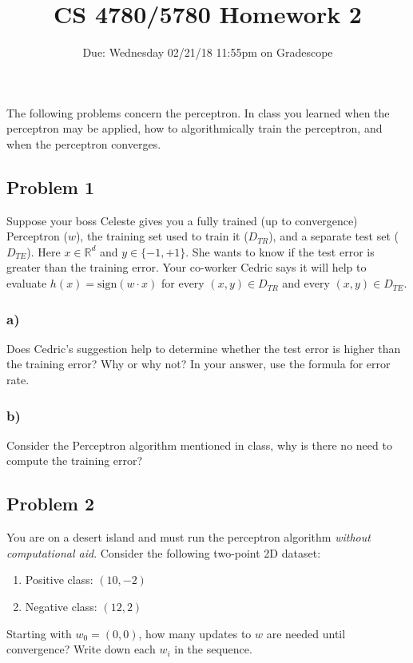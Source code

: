 \documentclass[a4paper]{article}
\title{CS 4780/5780 Homework 2}
\author{Due: Wednesday 02/21/18 11:55pm on Gradescope}
\date{}
\begin{document}
\maketitle

The following problems concern the perceptron. In class you learned when the perceptron may be applied, how to algorithmically train the perceptron, and when the perceptron converges.

\subsection*{Problem 1}
Suppose your boss Celeste gives you a fully trained (up to convergence) Perceptron ($w$), the training set used to train it ($D_{TR}$), and a separate test set ($D_{TE}$). Here $x\in\mathbb{R}^d$ and $y\in\{-1,+1\}$. She wants to know if the test error is greater than the training error. Your co-worker Cedric says it will help to evaluate $h(x)=\text{sign}(w\cdot x)$ for every $(x,y)\in D_{TR}$ and every $(x,y)\in D_{TE}$.
\subsubsection*{a)}
Does Cedric's suggestion help to determine whether the test error is higher than the training error? Why or why not? In your answer, use the formula for error rate.
\subsubsection*{b)}
Consider the Perceptron algorithm mentioned in class, why is there no need to compute the training error?

\subsection*{Problem 2}
You are on a desert island and must run the perceptron algorithm \textit{without computational aid}. Consider the following two-point 2D dataset:
\begin{enumerate}
\item Positive class: $(10, -2)$
\item Negative class: $(12, 2)$
\end{enumerate}
Starting with $w_0=(0,0)$, how many updates to $w$ are needed until convergence? Write down each $w_i$ in the sequence.
\end{document}
